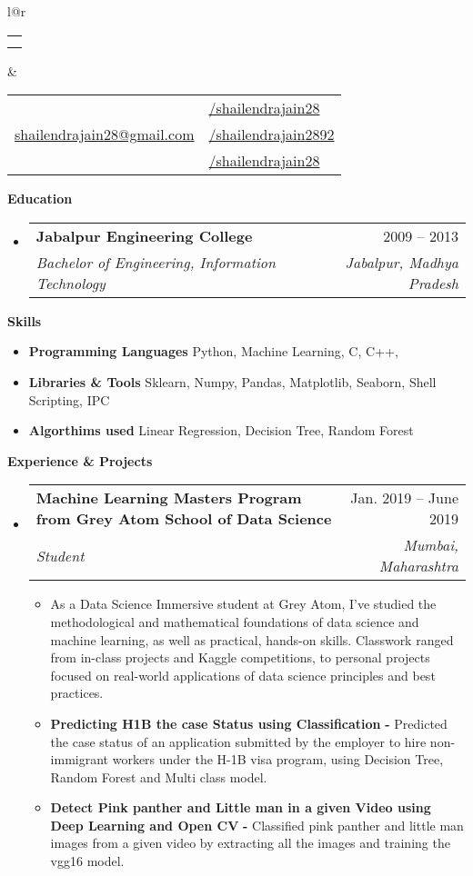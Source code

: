 \documentclass[letterpaper,12pt]{article}[leftmargin=*]
\makeatletter
\def \fullname {Shailendra Jain}
\def \subtitle {}
\def \linkedinicon {\faLinkedin}
\def \linkedinlink {https://www.linkedin.com/in/shailendrajain28/}
\def \linkedintext {/shailendrajain28}
\def \phoneicon {\faPhone}
\def \phonetext {+91-9967219623}
\def \emailicon {\faEnvelope}
\def \emaillink {mailto:shailendrajain28@gmail.com}
\def \emailtext {shailendrajain28@gmail.com}
\def \githubicon {\faGithub}
\def \githublink {https://github.com/shailendrajain2892}
\def \githubtext {/shailendrajain2892}
\def \websiteicon {\faGlobe}
\def \websitelink {https://medium.com/@shailendrajain28}
\def \websitetext {/shailendrajain28}
\def \headertype {\doublecol} %
\def \entryspacing {-0pt}
\def \linkedin {\linkedinicon \hspace{3pt}\href{\linkedinlink}{\linkedintext}}
\def \phone {\phoneicon \hspace{3pt}{ \phonetext}}
\def \email {\emailicon \hspace{3pt}\href{\emaillink}{\emailtext}}
\def \github {\githubicon \hspace{3pt}\href{\githublink}{\githubtext}}
\def \website {\websiteicon \hspace{3pt}\href{\websitelink}{\websitetext}}
\renewcommand{\section}[2]{\vspace{5pt}
  \colorbox{secondary}{\color{white}\raggedbottom\normalsize\textbf{{#1}{\hspace{7pt}#2}}}
}
\newcommand{\resumeEntryStart}{\begin{itemize}[leftmargin=2.5mm]}
\newcommand{\resumeEntryEnd}{\end{itemize}\vspace{\entryspacing}}
\newcommand{\resumeItemListStart}{\begin{itemize}[leftmargin=4.5mm]}
\newcommand{\resumeItemListEnd}{\end{itemize}}
\newcommand{\resumeItem}[1]{
  \item\small{
    {#1 \vspace{-2pt}}
  }
}
\newcommand{\resumeEntryTSDL}[4]{
  \vspace{-1pt}\item[]
    \begin{tabular*}{0.97\textwidth}{l@{\extracolsep{\fill}}r}
      \textbf{\color{primary}#1} & {\firabook\color{accent}\small#2} \\
      \textit{\color{accent}\small#3} & \textit{\color{accent}\small#4} \\
    \end{tabular*}\vspace{-6pt}
}
\newcommand{\resumeEntryS}[2]{
  \item[]\small{
    \textbf{\color{primary}#1 }{ #2 \vspace{-6pt}}
  }
}
\newcommand{\doublecol}[6]{
  \begin{tabular*}{\textwidth}{l@{\extracolsep{\fill}}r}
    {
      \begin{tabular}[c]{l}
        \fontsize{35}{45}\selectfont{\color{primary}{{\textbf{\fullname}}}} \\
        {\textit{\subtitle}} %
      \end{tabular}
    } & {
      \begin{tabular}[c]{l@{\hspace{1.5em}}l}
        {\small#4} & {\small#1} \\
        {\small#5} & {\small#2} \\
        {\small#6} & {\small#3}
      \end{tabular}
    }
  \end{tabular*}
}
\newcommand{\singlecol}[6]{
  \begin{tabular*}{\textwidth}{l@{\extracolsep{\fill}}r}
    {
      \begin{tabular}[b]{l}
        \fontsize{35}{45}\selectfont{\color{primary}{{\textbf{\fullname}}}} \\
        {\textit{\subtitle}} %
      \end{tabular}
    } & {
      \begin{tabular}[c]{l}
        {\small#1} \\
        {\small#2} \\
        {\small#3} \\
        {\small#4} \\
        {\small#5} \\
        {\small#6}
      \end{tabular}
    }
  \end{tabular*}
}
\makeatother
\begin{document}


\headertype{\linkedin}{\github}{\website}{\phone}{\email}{} %
\vspace{-10pt} %

\section{\faGraduationCap}{Education}

  \resumeEntryStart
    \resumeEntryTSDL
      {Jabalpur Engineering College}{2009 -- 2013}
      {Bachelor of Engineering, Information Technology}{Jabalpur, Madhya Pradesh}
  \resumeEntryEnd
\section{\faGears}{Skills}
 \resumeEntryStart
  \resumeEntryS{Programming Languages } {Python, Machine Learning, C, C++, }
  \resumeEntryS{Libraries \& Tools } {Sklearn, Numpy, Pandas, Matplotlib, Seaborn, Shell Scripting, IPC}
  \resumeEntryS{Algorthims used } {Linear Regression, Decision Tree, Random Forest}
 \resumeEntryEnd
\section{\faPieChart}{Experience \& Projects}

  \resumeEntryStart
    \resumeEntryTSDL
      {Machine Learning Masters Program from Grey Atom School of Data Science}{Jan. 2019 -- June 2019}
      {Student}{Mumbai, Maharashtra}
    \resumeItemListStart
      \resumeItem {As a Data Science Immersive student at Grey Atom, I've studied the methodological and mathematical foundations of data science and machine learning, as well as practical, hands-on skills. Classwork ranged from in-class projects and Kaggle competitions, to personal projects focused on real-world applications of data science principles and best practices.}
      \resumeItem {\textbf{Predicting H1B the case Status using Classification} \textbf{-} Predicted the case status of an application submitted by the employer to hire non-immigrant workers under the H-1B visa program, using Decision Tree, Random Forest and Multi class model.}
      \resumeItem {\textbf{Detect Pink panther and Little man in a given Video using Deep Learning and Open CV} \textbf{-} Classified pink panther and little man images from a given video by extracting all the images and training the vgg16 model. }      
    \resumeItemListEnd
  \resumeEntryEnd
  
\end{document}

